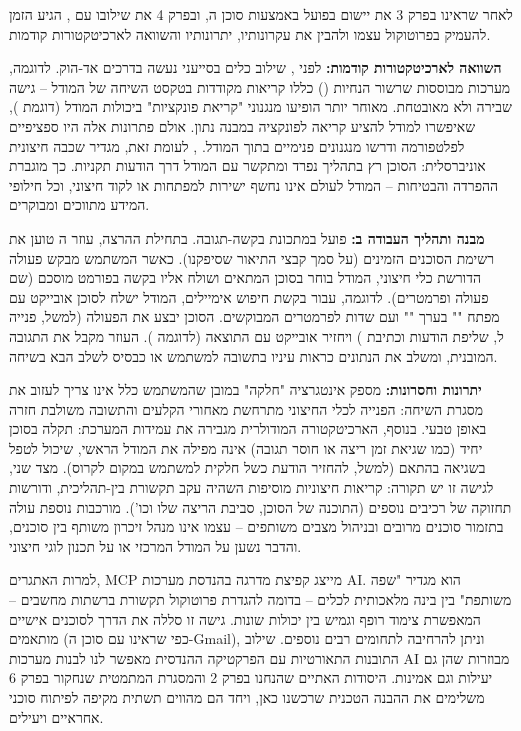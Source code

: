 
לאחר שראינו בפרק \num{3} את יישום  בפועל באמצעות סוכן ה, ובפרק \num{4} את שילובו עם , הגיע הזמן להעמיק בפרוטוקול עצמו ולהבין את עקרונותיו, יתרונותיו והשוואה לארכיטקטורות קודמות.

\textbf{השוואה לארכיטקטורות קודמות:} לפני , שילוב כלים בסייעני  נעשה בדרכים אד-הוק. לדוגמה, מערכות מבוססות שרשור הנחיות () כללו קריאות  מקודדות בטקסט השיחה של המודל – גישה שבירה ולא מאובטחת. מאוחר יותר הופיעו מנגנוני "קריאת פונקציות" ביכולות המודל (דוגמת ), שאיפשרו למודל להציע קריאה לפונקציה במבנה נתון. אולם פתרונות אלה היו ספציפיים לפלטפורמה ודרשו מנגנונים פנימיים בתוך המודל. , לעומת זאת, מגדיר שכבה חיצונית אוניברסלית: הסוכן רץ בתהליך נפרד ומתקשר עם המודל דרך הודעות  תקניות. כך מוגברת ההפרדה והבטיחות – המודל לעולם אינו נחשף ישירות למפתחות  או לקוד חיצוני, וכל חילופי המידע מתווכים ומבוקרים.

\textbf{מבנה ותהליך העבודה ב:}  פועל במתכונת בקשה-תגובה. בתחילת ההרצה, עוזר ה טוען את רשימת הסוכנים הזמינים (על סמך קבצי התיאור שסיפקנו). כאשר המשתמש מבקש פעולה הדורשת כלי חיצוני, המודל בוחר בסוכן המתאים ושולח אליו בקשה בפורמט  מוסכם (שם פעולה ופרמטרים). לדוגמה, עבור בקשת חיפוש אימיילים, המודל ישלח לסוכן  אובייקט עם מפתח "" בערך "" ועם שדות לפרמטרים המבוקשים. הסוכן יבצע את הפעולה (למשל, פנייה ל, שליפת הודעות וכתיבת ) ויחזיר אובייקט  עם התוצאה (לדוגמה ). העוזר מקבל את התגובה המובנית, ומשלב את הנתונים כראות עיניו בתשובה למשתמש או כבסיס לשלב הבא בשיחה.

\textbf{יתרונות וחסרונות:}  מספק אינטגרציה "חלקה" במובן שהמשתמש כלל אינו צריך לעזוב את מסגרת השיחה: הפנייה לכלי החיצוני מתרחשת מאחורי הקלעים והתשובה משולבת חזרה באופן טבעי. בנוסף, הארכיטקטורה המודולרית מגבירה את עמידות המערכת: תקלה בסוכן יחיד (כמו שגיאת זמן ריצה או חוסר תגובה) אינה מפילה את המודל הראשי, שיכול לטפל בשגיאה בהתאם (למשל, להחזיר הודעת כשל חלקית למשתמש במקום לקרוס). מצד שני, לגישה זו יש תקורה: קריאות חיצוניות מוסיפות השהיה עקב תקשורת בין-תהליכית, ודורשות תחזוקה של רכיבים נוספים (התוכנה של הסוכן, סביבת הריצה שלו וכו'). מורכבות נוספת עולה בתזמור סוכנים מרובים ובניהול מצבים משותפים –  עצמו אינו מנהל זיכרון משותף בין סוכנים, והדבר נשען על המודל המרכזי או על תכנון לוגי חיצוני.

למרות האתגרים, MCP מייצג קפיצת מדרגה בהנדסת מערכות AI. הוא מגדיר "שפה משותפת" בין בינה מלאכותית לכלים – בדומה להגדרת פרוטוקול תקשורת ברשתות מחשבים – המאפשרת צימוד רופף וגמיש בין יכולות שונות. גישה זו סללה את הדרך לסוכנים אישיים מותאמים (כפי שראינו עם סוכן ה-Gmail), וניתן להרחיבה לתחומים רבים נוספים. שילוב התובנות התאורטיות עם הפרקטיקה ההנדסית מאפשר לנו לבנות מערכות AI מבוזרות שהן גם יעילות וגם אמינות. היסודות האתיים שהנחנו בפרק \num{2} והמסגרת המתמטית שנחקור בפרק \num{6} משלימים את ההבנה הטכנית שרכשנו כאן, ויחד הם מהווים תשתית מקיפה לפיתוח סוכני  אחראיים ויעילים.
